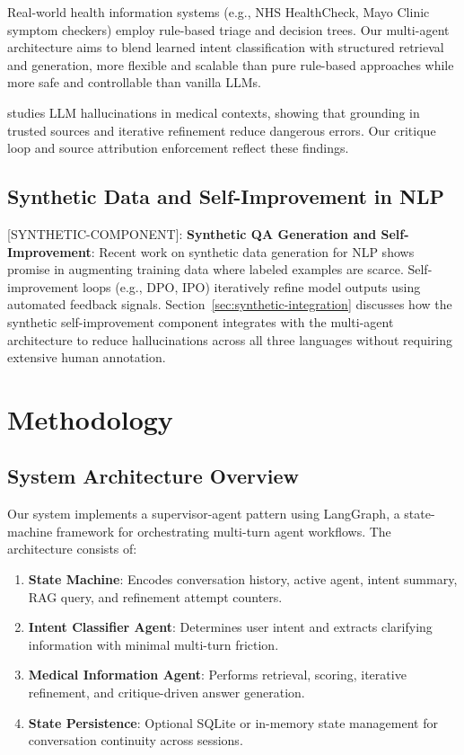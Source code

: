 \documentclass[11pt,a4paper]{article}
\newcommand{\synthetic}[1]{{\colorbox{syntheticcolor}{[SYNTHETIC-COMPONENT]: #1}}}
\begin{document}
Real-world health information systems (e.g., NHS HealthCheck, Mayo Clinic symptom checkers) employ rule-based triage and decision trees. Our multi-agent architecture aims to blend learned intent classification with structured retrieval and generation, more flexible and scalable than pure rule-based approaches while more safe and controllable than vanilla LLMs.

\cite{nori2023capabilities} studies LLM hallucinations in medical contexts, showing that grounding in trusted sources and iterative refinement reduce dangerous errors. Our critique loop and source attribution enforcement reflect these findings.

\subsection{Synthetic Data and Self-Improvement in NLP}

\synthetic{
\textbf{Synthetic QA Generation and Self-Improvement}: Recent work on synthetic data generation for NLP shows promise in augmenting training data where labeled examples are scarce. Self-improvement loops (e.g., DPO, IPO) iteratively refine model outputs using automated feedback signals. Section~\ref{sec:synthetic-integration} discusses how the synthetic self-improvement component integrates with the multi-agent architecture to reduce hallucinations across all three languages without requiring extensive human annotation.
}

\section{Methodology}

\subsection{System Architecture Overview}
\label{sec:methodology-architecture}

Our system implements a supervisor-agent pattern using LangGraph, a state-machine framework for orchestrating multi-turn agent workflows. The architecture consists of:

\begin{enumerate}
    \item \textbf{State Machine}: Encodes conversation history, active agent, intent summary, RAG query, and refinement attempt counters.
    \item \textbf{Intent Classifier Agent}: Determines user intent and extracts clarifying information with minimal multi-turn friction.
    \item \textbf{Medical Information Agent}: Performs retrieval, scoring, iterative refinement, and critique-driven answer generation.
    \item \textbf{State Persistence}: Optional SQLite or in-memory state management for conversation continuity across sessions.
\end{enumerate}
\end{document}
